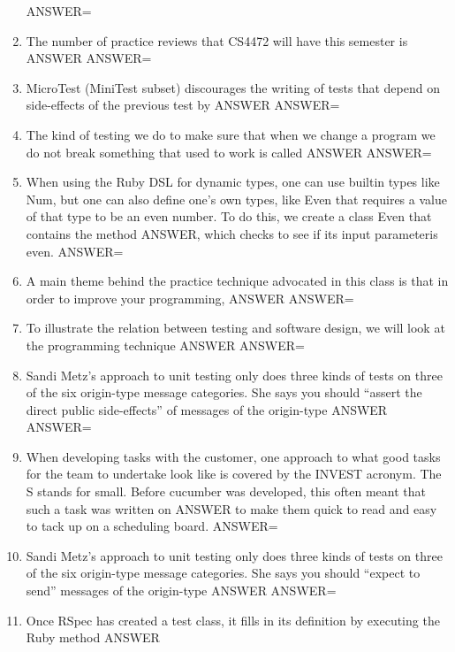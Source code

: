 \documentclass{exam}
\begin{document}
\begin{enumerate}
ANSWER=
\item The number of practice reviews that CS4472 will have this semester is ANSWER\newline
ANSWER=
\item MicroTest (MiniTest subset) discourages the writing of tests that depend on side-effects of the previous test by ANSWER\newline
ANSWER=
\item The kind of testing we do to make sure that when we change a program we do not break something that used to work is called ANSWER\newline
ANSWER=
\item When using the Ruby DSL for dynamic types, one can use builtin types like Num, but one can also define one's own types, like Even that requires a value of that type to be an even number.  To do this, we create a class Even that contains the method ANSWER, which checks to see if its input parameteris even.\newline
ANSWER=
\item A main theme behind the practice technique advocated in this class is that in order to improve your programming, ANSWER\newline
ANSWER=
\item To illustrate the relation between testing and software design, we will look at the programming technique ANSWER\newline
ANSWER=
\item Sandi Metz's approach to unit testing only does three kinds of tests on three of the six origin-type message categories.  She says you should ``assert the direct public side-effects'' of messages of the origin-type ANSWER\newline
ANSWER=
\item When developing tasks with the customer, one approach to what good tasks for the team to undertake look like is covered by the INVEST acronym.  The S stands for small.  Before cucumber was developed, this often meant that such a task was written on ANSWER to make them quick to read and easy to tack up on a scheduling board.\newline
ANSWER=
\item Sandi Metz's approach to unit testing only does three kinds of tests on three of the six origin-type message categories.  She says you should ``expect to send'' messages of the origin-type ANSWER\newline
ANSWER=
\item Once RSpec has created a test class, it fills in its definition by executing the Ruby method ANSWER\newline

\end{enumerate}
\end{document}
